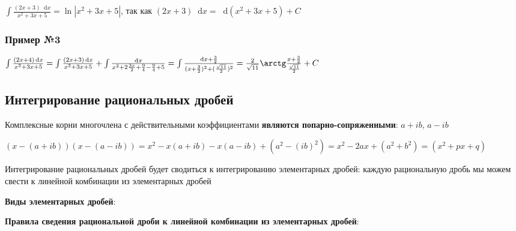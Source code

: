 \documentclass{article}
\newcommand*\diff{\mathop{}\!\mathrm{d}}
\begin{document}
$\int \frac{(2 x + 3) \diff x}{x^2 + 3x + 5} = \ln |x^2 + 3x + 5|$, так как $(2 x + 3) \diff x = \diff (x^2 + 3x + 5) + C$

\subsubsection{Пример №3}

$\int \frac{(2 x + 4) \diff x}{x^2 + 3x + 5} = \int \frac{(2 x + 3) \diff x}{x^2 + 3x + 5} + \int \frac{\diff x}{x^2 + 2 \frac{3 x}{2} + \frac{9}{4} - \frac{9}{4} + 5} = \int \frac{\diff x + \frac{3}{2}}{(x + \frac{3}{2})^2 + (\frac{\sqrt{11}}{2})^{2}} = \frac{2}{\sqrt{11}} \arctg \frac{x + \frac{3}{2}}{\frac{\sqrt{11}}{2}} + C $

\subsection{Интегрирование рациональных дробей}

Комплексные корни многочлена с действительными коэффициентами \textbf{являются попарно-сопряженными}: $a + i b$, $a - i b$

$(x - (a + i b))(x - (a - i b)) = x^2 - x (a + i b) - x (a - i b) + (a^2 - (i b)^2) = x^2 - 2 a x + (a^2 + b^2) = (x^2 + p x + q)$

\hfill

Интегрирование рациональных дробей будет сводиться к интегрированию элементарных дробей: каждую рациональную дробь мы можем свести к линейной комбинации из элементарных дробей

\textbf{Виды элементарных дробей}:

\begin{multienumerate}
\end{multienumerate}

\textbf{Правила сведения рациональной дроби к линейной комбинации из элементарных дробей}:
\end{document}
